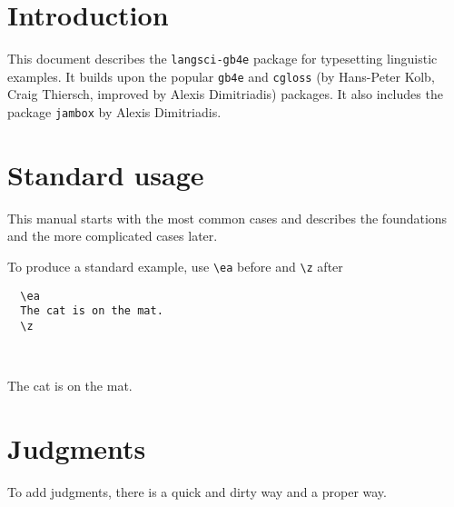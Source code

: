 \documentclass[output=paper]{langscibook}
\newcommand{\cmd}[1]{\texttt{\textbackslash#1}}
\begin{document}

%
%
%
%
%
%
%

\section{Introduction}
This document describes the \texttt{langsci-gb4e} package for typesetting linguistic examples. It builds upon the popular \texttt{gb4e}  and \texttt{cgloss} (by Hans-Peter Kolb, Craig Thiersch, improved by Alexis Dimitriadis) packages. It also includes the package \texttt{jambox} by Alexis Dimitriadis. 
\section{Standard usage}
This manual starts with the most common cases and describes the foundations and the more complicated cases later. 

To produce a standard example, use \cmd{ea} before and \cmd{z} after
 
\begin{minipage}[t]{.45\textwidth}
\begin{lstlisting}
  \ea 
  The cat is on the mat.
  \z
\end{lstlisting}
\end{minipage}~
\parbox[t]{.45\textwidth}{
  \ea 
  The cat is on the mat.
  \z
  }

\section{Judgments}  
  To add judgments, there is a quick and dirty way and a proper way. 
\end{document}
